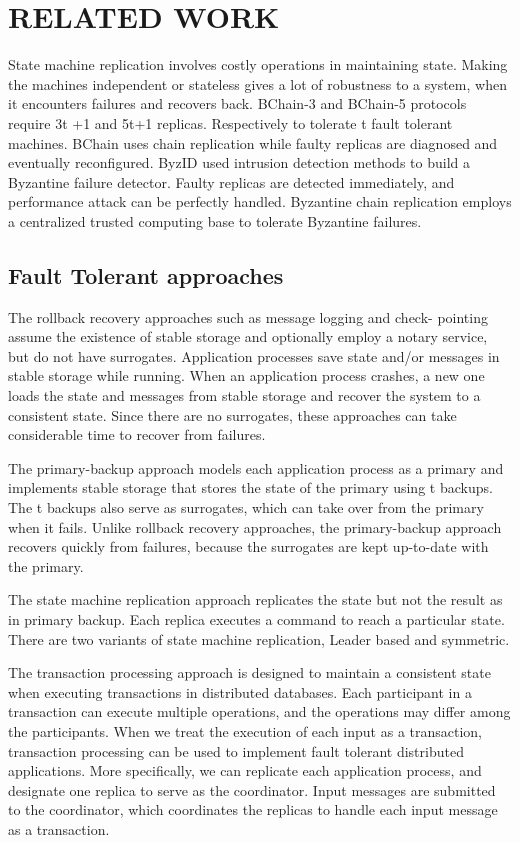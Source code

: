 \documentclass[letterpaper, 10 pt, conference]{ieeeconf}  %
\begin{document}
\section{RELATED WORK}

State machine replication involves costly operations in maintaining state. Making the machines independent or stateless gives a lot of robustness to a system, when it encounters failures and recovers back.
BChain-3 and BChain-5 protocols require 3t +1 and 5t+1 replicas. Respectively to tolerate t fault tolerant machines. BChain uses chain replication while faulty replicas are diagnosed and eventually reconfigured. ByzID used intrusion detection methods to build a Byzantine failure detector. Faulty replicas are detected immediately, and performance attack can be perfectly handled. Byzantine chain replication employs a centralized trusted computing base to tolerate Byzantine failures.

\subsection{Fault Tolerant approaches}
The rollback recovery approaches such as message logging and check- pointing assume the existence of stable storage and optionally employ a notary service, but do not have surrogates. Application processes save state and/or messages in stable storage while running. When an application process crashes, a new one loads the state and messages from stable storage and recover the system to a consistent state. Since there are no surrogates, these approaches can take considerable time to recover from failures.

The primary-backup approach models each application process as a primary and implements stable storage that stores the state of the primary using t backups. The t backups also serve as surrogates, which can take over from the primary when it fails. Unlike rollback recovery approaches, the primary-backup approach recovers quickly from failures, because the surrogates are kept up-to-date with the primary.

The state machine replication approach replicates the state but not the result as in primary backup. Each replica executes a command to reach a particular state. There are two variants of state machine replication, Leader based and symmetric.

The transaction processing approach is designed to maintain a consistent state when executing transactions in distributed databases. Each participant in a transaction can execute multiple operations, and the operations may differ among the participants. When we treat the execution of each input as a transaction, transaction processing can be used to implement fault tolerant distributed applications. More specifically, we can replicate each application process, and designate one replica to serve as the coordinator. Input messages are submitted to the coordinator, which coordinates the replicas to handle each input message as a transaction.
\end{document}
